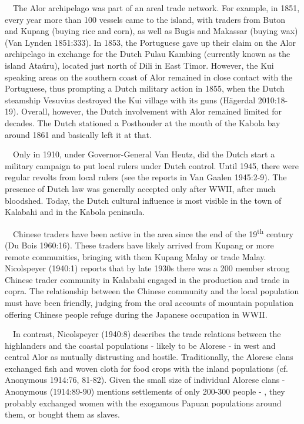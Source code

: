 \ \ The Alor archipelago was part of an areal trade network. For example, in 1851, every year more than 100 vessels came to the island, with traders from Buton and Kupang (buying rice and corn), as well as Bugis and Makassar (buying wax) (Van Lynden 1851:333). In 1853, the Portuguese gave up their claim on the Alor archipelago in exchange for the Dutch Pulau Kambing (currently known as the island Ata\'uru), located just north of Dili in East Timor. However, the Kui speaking areas on the southern coast of Alor remained in close contact with the Portuguese, thus prompting a Dutch military action in 1855, when the Dutch steamship Vesuvius destroyed the Kui village with its guns (H\"agerdal 2010:18{}-19). Overall, however, the Dutch involvement with Alor remained limited for decades. The Dutch stationed a Posthouder at the mouth of the Kabola bay around 1861 and basically left it at that.

\ \ Only in 1910, under Governor-General Van Heutz, did the Dutch start a military campaign to put local rulers under Dutch control. Until 1945, there were regular revolts from local rulers (see the reports in Van Gaalen 1945:2-9). The presence of Dutch law was generally accepted only after WWII, after much bloodshed. Today, the Dutch cultural influence is most visible in the town of Kalabahi and in the Kabola peninsula.

\ \ Chinese traders have been active in the area since the end of the 19\textsuperscript{th} century (Du Bois 1960:16). These traders have likely arrived from Kupang or more remote communities, bringing with them Kupang Malay or trade Malay. Nicolspeyer (1940:1) reports that by late 1930s there was a 200 member strong Chinese trader community in Kalabahi engaged in the production and trade in copra. The relationship between the Chinese community and the local population must have been friendly, judging from the oral accounts of mountain population offering Chinese people refuge during the Japanese occupation in WWII. 

\ \ In contrast, Nicolspeyer (1940:8) describes the trade relations between the highlanders and the coastal populations  {}- likely to be Alorese - in west and central Alor as mutually distrusting and hostile. Traditionally, the Alorese clans exchanged fish and woven cloth for food crops with the inland populations (cf. Anonymous 1914:76, 81-82). Given the small size of individual Alorese clans - Anonymous (1914:89-90) mentions settlements of only 200-300 people - , they probably exchanged women with the exogamous Papuan populations around them, or bought them as slaves.

